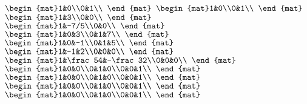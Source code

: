 \begin{Answer}
\Question $\begin{mat}1&0\\0&1\\ \end{mat}$
\Question $\begin{mat}1&0\\0&1\\ \end{mat}$
\Question $\begin{mat}1&3\\0&0\\ \end{mat}$
\Question $\begin{mat}1&-7/5\\0&0\\ \end{mat}$
\Question $\begin{mat}1&0&3\\0&1&7\\ \end{mat}$
\Question $\begin{mat}1&0&-1\\0&1&5\\ \end{mat}$
\Question $\begin{mat}1&-1&2\\0&0&0\\ \end{mat}$
\Question $\begin{mat}1&\frac54&-\frac32\\0&0&0\\ \end{mat}$
\Question $\begin{mat}1&0&0\\0&1&0\\0&0&1\\ \end{mat}$
\Question $\begin{mat}1&0&0\\0&1&0\\0&0&1\\ \end{mat}$
\Question $\begin{mat}1&0&0\\0&1&0\\0&0&1\\ \end{mat}$
\Question $\begin{mat}1&0&0\\0&1&0\\0&0&1\\ \end{mat}$

\end{Answer}

